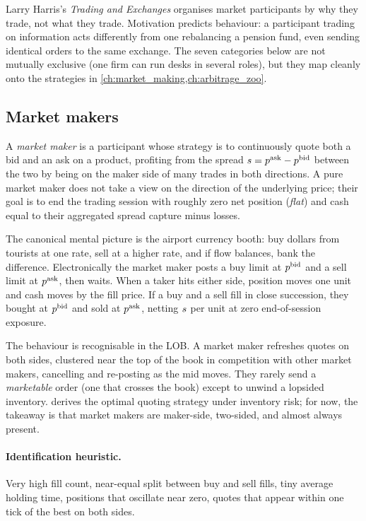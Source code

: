 Larry Harris's \emph{Trading and Exchanges} \citeHarris{} organises
market participants by why they trade, not what they trade. Motivation
predicts behaviour: a participant trading on information acts
differently from one rebalancing a pension fund, even sending identical
orders to the same exchange. The seven categories below are not
mutually exclusive (one firm can run desks in several roles), but
they map cleanly onto the strategies in
\cref{ch:market_making,ch:arbitrage_zoo}.

\subsection{Market makers}
\label{subsec:mm}

\begin{definition}
A \emph{market maker} is a participant whose strategy is to
continuously quote both a bid and an ask on a product, profiting from
the spread $s = p^{\mathrm{ask}} - p^{\mathrm{bid}}$ between the two by being on the
maker side of many trades in both directions. A pure market maker does
not take a view on the direction of the underlying price; their goal
is to end the trading session with roughly zero net position
(\emph{flat}) and cash equal to their aggregated spread capture minus
losses.
\end{definition}

The canonical mental picture is the airport currency booth: buy
dollars from tourists at one rate, sell at a higher rate, and if flow
balances, bank the difference. Electronically the market maker posts a
buy limit at $p^{\mathrm{bid}}$ and a sell limit at $p^{\mathrm{ask}}$, then waits. When a
taker hits either side, position moves one unit and cash moves by the
fill price. If a buy and a sell fill in close succession, they bought
at $p^{\mathrm{bid}}$ and sold at $p^{\mathrm{ask}}$, netting $s$ per unit at zero
end-of-session exposure.

The behaviour is recognisable in the LOB. A market maker refreshes
quotes on both sides, clustered near the top of the book in
competition with other market makers, cancelling and re-posting as the
mid moves. They rarely send a \emph{marketable} order (one that
crosses the book) except to unwind a lopsided inventory.
 derives the optimal quoting strategy under
inventory risk; for now, the takeaway is that market makers are
maker-side, two-sided, and almost always present.

\paragraph{Identification heuristic.} Very high fill count, near-equal
split between buy and sell fills, tiny average holding time, positions
that oscillate near zero, quotes that appear within one tick of the
best on both sides.

